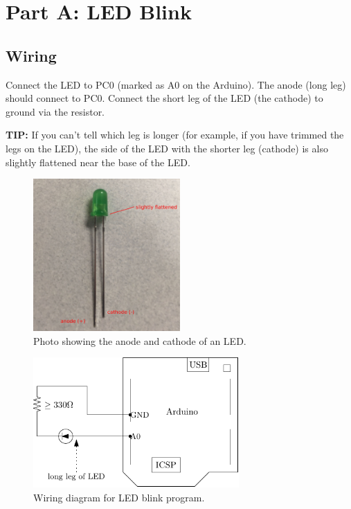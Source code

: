 \documentclass{article}
\begin{document}
\section{Part A: LED Blink}

\subsection{Wiring}

Connect the LED to PC0 (marked as A0 on the Arduino). The anode (long leg)
should connect to PC0. Connect the short leg of the LED (the cathode) to ground
via the resistor.

\textbf{TIP:} If you can't tell which leg is longer (for example, if you have
trimmed the legs on the LED), the side of the LED with the shorter leg
(cathode) is also slightly flattened near the base of the LED.

\begin{figure}[H]
	\centering

	\includegraphics[max width = 0.5\textwidth]{led.jpg}

	\caption{Photo showing the anode and cathode of an LED.}

\end{figure}

\begin{figure}[H]
	\centering

	\includegraphics[max width = 0.7\textwidth]{wiring_diagram.pdf}

	\caption{Wiring diagram for LED blink program.}

\end{figure}
\end{document}
